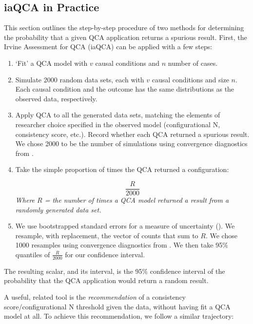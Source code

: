 \documentclass[]{article}
\begin{document}
{\subsection{iaQCA in Practice}

This section outlines the step-by-step procedure of two methods for determining the probability that a given QCA application returns a spurious result. First, the Irvine Assessment for QCA (iaQCA) can be applied with a few steps: 

\begin{enumerate}
  \item `Fit' a QCA model with $v$ causal conditions and $n$ number of cases. 
  \item Simulate 2000 random data sets, each with $v$ causal conditions and size $n$. Each causal condition and the outcome has the same distributions as the observed data, respectively. 
  \item Apply QCA to all the generated data sets, matching the elements of researcher choice specified in the observed model (configurational N, consistency score, etc.). Record whether each QCA returned a spurious result. We chose 2000 to be the number of simulations using convergence diagnostics from \cite{gelman_and_rubin_1992}. 
  \item Take the simple proportion of times the QCA returned a configuration: 
  \begin{center}
  \[
  \frac{R}{2000} 
  \]
  {\it{Where $R$ = the number of times a QCA model returned a result from a randomly generated data set.}}
  \end{center}
  \item We use bootstrapped standard errors for a measure of uncertainty (\citealt{efron_and_tibshirani_1994}). We resample, with replacement, the vector of counts that sum to $R$. We chose 1000 resamples using convergence diagnostics from \citet{gelman_and_rubin_1992}. We then take 95\% quantiles of  $\frac{R}{2000}$ for our confidence interval.
\end{enumerate}


The resulting scalar, and its interval, is the 95\% confidence interval of the probability that the QCA application would return a random result. 

A useful, related tool is the {\it{recommendation}} of a consistency score/configurational N threshold given the data, without having fit a QCA model at all. To achieve this recommendation, we follow a similar trajectory: 

}
\end{document}
